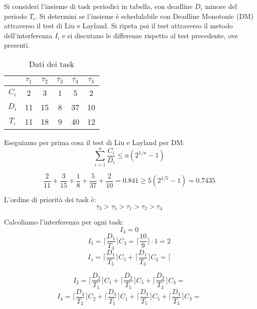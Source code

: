 \begin{Esercizio8}



Si consideri l'insieme di task periodici in tabella, 
con deadline $D_i$ minore del periodo $T_i$. 
Si determini se l'insieme è schedulabile con 
Deadline Monotonic (DM) attraverso il test di Liu e Layland. 
Si ripeta poi il test attraverso il metodo dell'interferenza $I_i$ e 
si discutano le differenze rispetto al test precedente, ove presenti.

\begin{table}[!h]
\centering
\caption{Dati dei task}
\begin{tabular}{|c|c|c|c|c|c|}
\hline
 & $\tau_1$ & $\tau_2$ & $\tau_3$ & $\tau_4$ & $\tau_5$ \\
\hline
$C_i$ & 2 & 3 & 1 & 5 & 2 \\
\hline
$D_i$ & 11 & 15 & 8 & 37 & 10 \\
\hline
$T_i$ & 11 & 18 & 9 & 40 & 12 \\
\hline
\end{tabular}
\label{tab:dm_tasks}
\end{table}


Eseguiamo per prima cosa il test di Liu e Layland per DM:
\[
\sum_{i=1}^{n} \frac{C_{i}}{D_{i}} \le n (2^{1/n} - 1)
\]

\[\frac{2}{11} + \frac{3}{15} + \frac{1}{8} + \frac{5}{37} + \frac{2}{10} 
= 0.841
\ge 5 (2^{1/5} - 1) = 0.7435\]



L'ordine di priorità dei task è:
\[
\tau_{3} > \tau_{5} > \tau_{1} > \tau_{2} > \tau_{4}
\]


Calcoliamo l'interferenza per ogni task:
\[ I_{3} = 0 \]
\[ I_{5} = \lceil \frac{D_{5}}{T_{3}} \rceil C_{3} = \lceil \frac{10}{9} \rceil  \cdot 1 = 2 \]
\[I_{1} = \lceil \frac{D_{1}}{T_{5}} \rceil C_{5}  + \lceil \frac{D_{1}}{T_{3}} \rceil C_{3}
= \lceil   \]

\[I_{2} = \lceil \frac{D_{2}}{T_{1}} \rceil C_{1} + \lceil \frac{D_{2}}{T_{5}} \rceil C_{5} 
 + \lceil \frac{D_{2}}{T_{3}} \rceil C_{3}
=   \]
\[I_{4} = \lceil \frac{D_{4}}{T_{2}} \rceil C_{2}  + 
\lceil \frac{D_{4}}{T_{1}} \rceil C_{1} + \lceil \frac{D_{4}}{T_{5}} \rceil C_{5} 
 + \lceil \frac{D_{4}}{T_{3}} \rceil C_{3}
=   \]


\end{Esercizio8}

\begin{Esercizio9}



\end{Esercizio9}